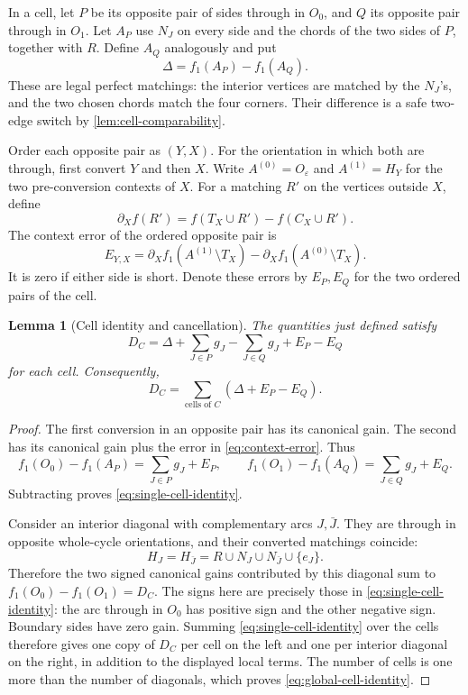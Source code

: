 \documentclass[11pt]{article}
\newtheorem{lemma}[theorem]{Lemma}
\theoremstyle{definition}
\theoremstyle{remark}
\numberwithin{equation}{section}
\begin{document}
In a cell, let $P$ be its opposite pair of sides through in $O_0$,
and $Q$ its opposite pair through in $O_1$.  Let $A_P$ use $N_J$ on
every side and the chords of the two sides of $P$, together with $R$.
Define $A_Q$ analogously and put
\[
 \Delta=f_1(A_P)-f_1(A_Q).
\]
These are legal perfect matchings: the interior vertices are matched
by the $N_J$'s, and the two chosen chords match the four corners.
Their difference is a safe two-edge switch by
\cref{lem:cell-comparability}.

Order each opposite pair as $(Y,X)$.  For the orientation in which
both are through, first convert $Y$ and then $X$.
Write $A^{(0)}=O_\varepsilon$ and $A^{(1)}=H_Y$ for the two
pre-conversion contexts of $X$.  For a matching $R'$ on the vertices
outside $X$, define
\begin{equation}
\label{eq:arc-derivative}
 \partial_X f(R')=f(T_X\cup R')-f(C_X\cup R').
\end{equation}
The context error of the ordered opposite pair is
\begin{equation}
\label{eq:context-error}
 E_{Y,X}
 =\partial_X f_1(A^{(1)}\setminus T_X)
  -\partial_X f_1(A^{(0)}\setminus T_X).
\end{equation}
It is zero if either side is short.  Denote these errors by $E_P,E_Q$
for the two ordered pairs of the cell.

\begin{lemma}[Cell identity and cancellation]
\label{lem:cell-identity}
The quantities just defined satisfy
\begin{equation}
\label{eq:single-cell-identity}
 D_C=\Delta+\sum_{J\in P}g_J-\sum_{J\in Q}g_J+E_P-E_Q
\end{equation}
for each cell.  Consequently,
\begin{equation}
\label{eq:global-cell-identity}
 D_C=\sum_{\text{cells of }C}(\Delta+E_P-E_Q).
\end{equation}
\end{lemma}

\begin{proof}
The first conversion in an opposite pair has its canonical gain.
The second has its canonical gain plus the error in
\eqref{eq:context-error}.  Thus
\[
 f_1(O_0)-f_1(A_P)=\sum_{J\in P}g_J+E_P,
 \qquad
 f_1(O_1)-f_1(A_Q)=\sum_{J\in Q}g_J+E_Q.
\]
Subtracting proves \eqref{eq:single-cell-identity}.

Consider an interior diagonal with complementary arcs $J,\bar J$.
They are through in opposite whole-cycle orientations, and their
converted matchings coincide:
\[
 H_J=H_{\bar J}=R\cup N_J\cup N_{\bar J}\cup\{e_J\}.
\]
Therefore the two signed canonical gains contributed by this
diagonal sum to $f_1(O_0)-f_1(O_1)=D_C$.  The signs here are precisely
those in \eqref{eq:single-cell-identity}: the arc through in $O_0$
has positive sign and the other negative sign.  Boundary sides have
zero gain.  Summing \eqref{eq:single-cell-identity} over the cells
therefore gives one copy of $D_C$ per cell on the left and one per
interior diagonal on the right, in addition to the displayed local
terms.  The number of cells is one more than the number of diagonals,
which proves \eqref{eq:global-cell-identity}.
\end{proof}
\end{document}
